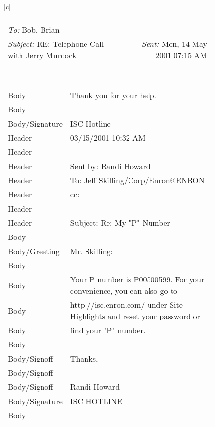 \documentclass{llncs}
\begin{document}
\begin{figure}
\centering
\begin{tabular}{|c|}
	\hline 
	\scriptsize{
	\begin{tabular*}{\textwidth}{@{\extracolsep{\fill}}lr}
		\makecell{
			\textit{From:} Alice\\ 
			\textit{To:} Bob, Brian\\
			\textit{Subject:} RE: Telephone Call with Jerry Murdock
		} &
		\hspace*{\fill} { \textit{Sent:} Mon, 14 May 2001 07:15 AM}
	\end{tabular*}
}
	\\ 
	\hline 
	\scriptsize{
	\begin{tabular*}{\textwidth}{l|l} 
		Body           & Thank you for your help. \\
		Body           & \\
		Body/Signature & ISC Hotline\\\hline
		Header         & 03/15/2001 10:32 AM \\
		Header         & \\
		Header         & Sent by: Randi Howard \\
		Header         & To: Jeff Skilling/Corp/Enron@ENRON\\
		Header         & cc:\\
		Header         & \\
		Header         & Subject: Re: My "P" Number\\\hline
		Body           & \\
		Body/Greeting  & Mr. Skilling: \\
		Body           & \\
		Body           & Your P number is P00500599.  For your convenience, you can also go to\\
		Body           & http://isc.enron.com/ under Site Highlights and reset your password or \\
		Body           & find your "P" number.\\
		Body           & \\
		Body/Signoff   & Thanks,\\
		Body/Signoff   & \\
		Body/Signoff   & Randi Howard\\
		Body/Signature & ISC HOTLINE\\
		Body           & \\\hline

\end{tabular*}}
\end{tabular}
\end{figure}
\end{document}
